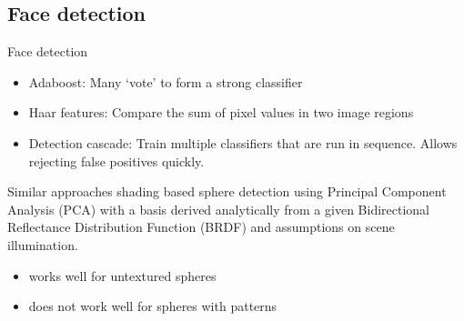 

\subsection{Face detection}
\begin{frame}{Face detection}
	\citet{viola2001robust}
	\begin{itemize}
		\item Adaboost: Many  `vote' to form a strong classifier
		\item Haar features: Compare the sum of pixel values in two image regions
		\item Detection cascade: Train multiple classifiers that are run in sequence. Allows rejecting false positives quickly.
	\end{itemize}
\end{frame}

\begin{frame}{Similar approaches}
	\citet{nillius2008shading}
	shading based sphere detection using Principal Component Analysis (PCA) with a basis derived analytically from a given Bidirectional Reflectance Distribution Function (BRDF) and assumptions on scene illumination.
	\begin{itemize}
		\item works well for untextured spheres
		\item does not work well for spheres with patterns
	\end{itemize}
\end{frame}

